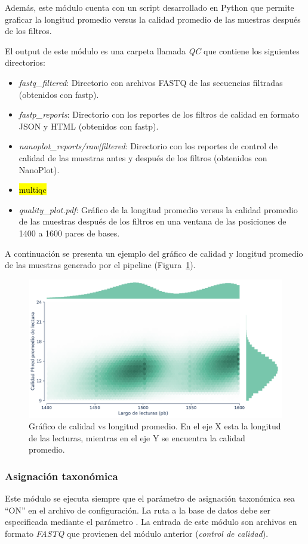 Además, este módulo cuenta con un script desarrollado en Python que permite graficar la longitud promedio versus la calidad promedio de las muestras después de los filtros.

El output de este módulo es una carpeta llamada \textit{QC} que contiene los siguientes directorios:
\begin{itemize}
    \item \textit{fastq\_filtered}: Directorio con archivos FASTQ de las secuencias filtradas (obtenidos con fastp).
    \item \textit{fastp\_reports}: Directorio con los reportes de los filtros de calidad en formato JSON y HTML (obtenidos con fastp).
    \item \textit{nanoplot\_reports/raw|filtered}: Directorio con los reportes de control de calidad de las muestras antes y después de los filtros (obtenidos con NanoPlot).
    \item \hl{multiqc}
    \item \textit{quality\_plot.pdf}: Gráfico de la longitud promedio versus la calidad promedio de las muestras después de los filtros en una ventana de las posiciones de 1400 a 1600 pares de bases.
\end{itemize}

A continuación se presenta un ejemplo del gráfico de calidad y longitud promedio de las muestras generado por el pipeline (Figura~\ref{fig:pipeline-quality_plot}).
\begin{figure}[H]
    \centering
    \includegraphics[width=0.85\linewidth]{images/pipeline/quality_plot.pdf}
    \caption{Gráfico de calidad vs longitud promedio. En el eje X esta la longitud de las lecturas, mientras en el eje Y se encuentra la calidad promedio.}
    \label{fig:pipeline-quality_plot}
\end{figure}
\subsubsection{Asignación taxonómica}
Este módulo se ejecuta siempre que el parámetro de asignación taxonómica sea ``ON'' en el archivo de configuración. 
La ruta a la base de datos debe ser especificada mediante el parámetro .
La entrada de este módulo son archivos en formato \textit{FASTQ} que provienen del módulo anterior (\textit{control de calidad}).

